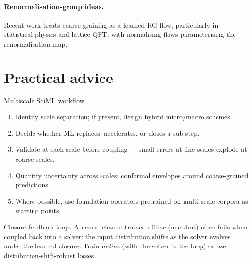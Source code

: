 \paragraph{Renormalisation-group ideas.}
Recent work treats coarse-graining as a learned RG flow, particularly
in statistical physics and lattice QFT, with normalising flows
parameterising the renormalisation map.

\section{Practical advice}
\begin{recipe}{Multiscale SciML workflow}
\begin{enumerate}
\item Identify scale separation; if present, design hybrid micro/macro
schemes.
\item Decide whether ML replaces, accelerates, or closes a sub-step.
\item Validate at each scale before coupling --- small errors at fine
scales explode at coarse scales.
\item Quantify uncertainty across scales; conformal envelopes around
coarse-grained predictions.
\item Where possible, use foundation operators pretrained on multi-scale
corpora as starting points.
\end{enumerate}
\end{recipe}

\begin{pitfall}{Closure feedback loops}
A neural closure trained offline (one-shot) often fails when coupled
back into a solver: the input distribution shifts as the solver
evolves under the learned closure. Train \emph{online} (with the
solver in the loop) or use distribution-shift-robust losses.
\end{pitfall}
